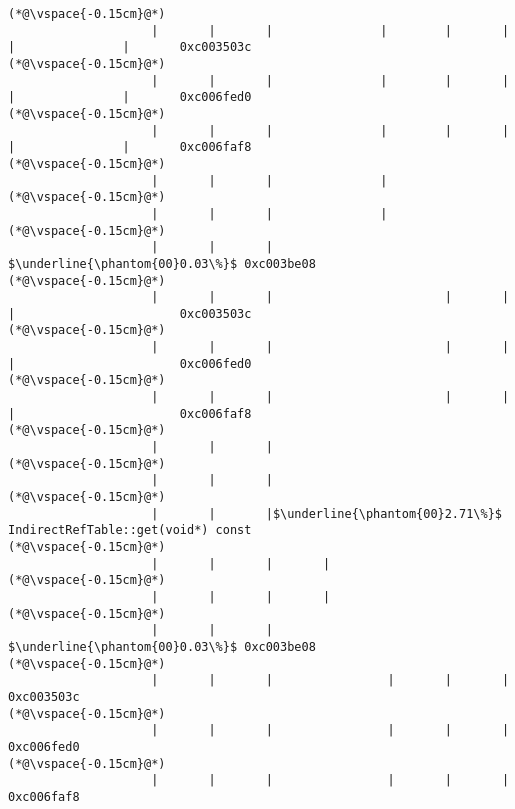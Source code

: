 \begin{lstlisting}[caption=Unicode-merkkijonon kopiointi C$\to$Java, label=profile:C2JCopyUnicode-512, numberbychapter=true, frame=lines, float, floatplacement=t]
(*@\vspace{-0.15cm}@*)
                    |       |       |               |        |       |       |               |       0xc003503c
(*@\vspace{-0.15cm}@*)
                    |       |       |               |        |       |       |               |       0xc006fed0
(*@\vspace{-0.15cm}@*)
                    |       |       |               |        |       |       |               |       0xc006faf8
(*@\vspace{-0.15cm}@*)
                    |       |       |               |
(*@\vspace{-0.15cm}@*)
                    |       |       |               |
(*@\vspace{-0.15cm}@*)
                    |       |       |                $\underline{\phantom{00}0.03\%}$ 0xc003be08
(*@\vspace{-0.15cm}@*)
                    |       |       |                        |       |       |                       0xc003503c
(*@\vspace{-0.15cm}@*)
                    |       |       |                        |       |       |                       0xc006fed0
(*@\vspace{-0.15cm}@*)
                    |       |       |                        |       |       |                       0xc006faf8
(*@\vspace{-0.15cm}@*)
                    |       |       |
(*@\vspace{-0.15cm}@*)
                    |       |       |
(*@\vspace{-0.15cm}@*)
                    |       |       |$\underline{\phantom{00}2.71\%}$ IndirectRefTable::get(void*) const
(*@\vspace{-0.15cm}@*)
                    |       |       |       |
(*@\vspace{-0.15cm}@*)
                    |       |       |       |
(*@\vspace{-0.15cm}@*)
                    |       |       |        $\underline{\phantom{00}0.03\%}$ 0xc003be08
(*@\vspace{-0.15cm}@*)
                    |       |       |                |       |       |               0xc003503c
(*@\vspace{-0.15cm}@*)
                    |       |       |                |       |       |               0xc006fed0
(*@\vspace{-0.15cm}@*)
                    |       |       |                |       |       |               0xc006faf8

\end{lstlisting}

